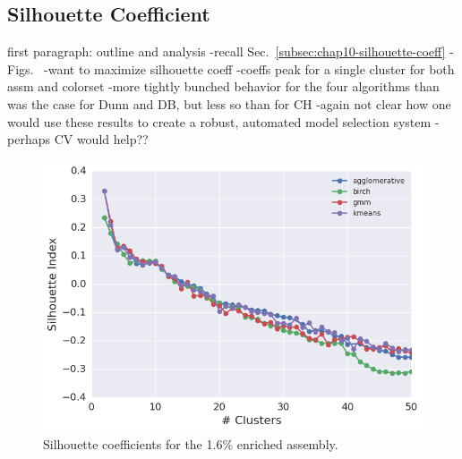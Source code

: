 \clearpage

\subsection{Silhouette Coefficient}
\label{subsec:chap11-silhouette-coeff}

first paragraph: outline and analysis
-recall Sec.~\ref{subsec:chap10-silhouette-coeff}
-Figs.~
-want to maximize silhouette coeff
-coeffs peak for a single cluster for both assm and colorset
-more tightly bunched behavior for the four algorithms than was the case for Dunn and DB, but less so than for CH
-again not clear how one would use these results to create a robust, automated model selection system
  -perhaps CV would help??

\begin{figure}[h!]
\centering
\includegraphics[width=0.87\linewidth]{figures/results/model-select/assm-16/silhouette-combined-U238-capture-1}
\vspace{2mm}
\caption[Silhouette coefficients for the 1.6\% enriched assembly]{Silhouette coefficients for the 1.6\% enriched assembly.}
\label{fig:chap11-assm-16-silhouette-coeff}
\end{figure}

